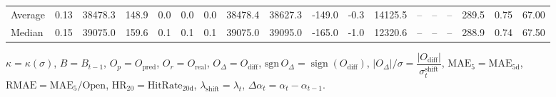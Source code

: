 \begin{threeparttable}
{\begin{tabular}{lrrrrrrrrrrrrrrrrr}
Average &     0.13 & 38478.3 &             148.9 &               0.0 &                0.0 &                0.0 & 38478.4 & 38627.3 &     -149.0 &                     -0.3 &             14125.5 &         -- &        -- &             -- &            289.5 &            0.75 &                  67.00 \\
 Median &     0.15 & 39075.0 &             159.6 &               0.1 &                0.1 &                0.1 & 39075.0 & 39095.0 &     -165.0 &                     -1.0 &             12320.6 &         -- &        -- &             -- &            288.9 &            0.74 &                  67.50 \\
\bottomrule
\end{tabular}
}
\begin{tablenotes}\footnotesize
\item $\kappa=\kappa(\sigma)$, $B=B_{t-1}$, $O_p=O_{\text{pred}}$, $O_r=O_{\text{real}}$, $O_\Delta=O_{\text{diff}}$, $\mathrm{sgn}\,O_\Delta=\operatorname{sign}(O_{\text{diff}})$, $|O_\Delta|/\sigma=\dfrac{|O_{\text{diff}}|}{\sigma_t^{\text{shift}}}$, $\mathrm{MAE}_5=\mathrm{MAE}_{5\text{d}}$, $\mathrm{RMAE}= \mathrm{MAE}_5 / \text{Open}$, $\mathrm{HR}_{20}=\mathrm{HitRate}_{20\text{d}}$, 
$\lambda_{\text{shift}}=\lambda_t$, 
$\Delta\alpha_t=\alpha_t-\alpha_{t-1}$.
\end{tablenotes}
\end{threeparttable}
\endgroup

